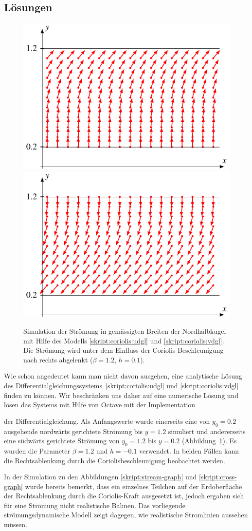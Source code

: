 \subsection{Lösungen}
\begin{figure}
\centering
\includegraphics[width=0.48\hsize]{chapters/2/upright.pdf}
\hspace{0.02\hsize}
\includegraphics[width=0.48\hsize]{chapters/2/downright.pdf}
\caption{Simulation der Strömung in gemässigten Breiten der Nordhalbkugel
mit Hilfe des Modells
\eqref{skript:coriolis:udgl}
und
\eqref{skript:coriolis:vdgl}.
Die Strömung wird unter dem Einfluss der Coriolis-Beschleunigung nach
rechts abgelenkt ($\beta=1.2$, $h=0.1$).
\label{section:coriolis:simbild}}
\end{figure}
Wie schon angedeutet kann man nicht davon ausgehen, eine analytische
Lösung des Differentialgleichungssystems~\eqref{skript:coriolis:udgl}
und \eqref{skript:coriolis:vdgl}
finden zu können.
Wir beschränken uns daher auf eine numerische Lösung und
lösen das Systems mit Hilfe von Octave mit der Implementation

der Differentialgleichung.
Als Anfangswerte wurde einerseits eine von $y_0=0.2$ ausgehende nordwärts
gerichtete Strömung bis $y=1.2$ simuliert und andererseits eine südwärts
gerichtete Strömung von $y_0=1.2$ bis $y=0.2$
(Abbildung~\ref{section:coriolis:simbild}).
Es wurden die Parameter $\beta=1.2$ und $h=-0.1$ verwendet.
In beiden Fällen kann die Rechtsablenkung durch die Coriolisbeschleunigung
beobachtet werden.

In der Simulation zu den Abbildungen
\ref{skript:stream-graph}
und
\ref{skript:cross-graph}
wurde bereits bemerkt, dass ein einzelnes Teilchen auf der Erdoberfläche
der Rechtsablenkung durch die Coriolis-Kraft ausgesetzt ist,
jedoch ergaben sich für eine Strömung nicht realistische Bahnen.
Das vorliegende strömungsdynamische Modell zeigt dagegen, wie
realistische Stromlinien aussehen müssen.

